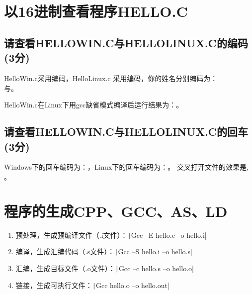 \section{以16进制查看程序HELLO.C}
\subsection{请查看HELLOWIN.C与HELLOLINUX.C的编码(3分)}

HelloWin.c采用编码，HelloLinux.c 采用编码，你的姓名分别编码为：\\
与。

HelloWin.c在Linux下用gcc缺省模式编译后运行结果为：。

\subsection{请查看HELLOWIN.C与HELLOLINUX.C的回车(3分)} 

Windows下的回车编码为：，Linux下的回车编码为：。
交叉打开文件的效果是,
。

\section{程序的生成CPP、GCC、AS、LD}


\begin{enumerate}
	\item 预处理，生成预编译文件（.i文件）：\texttt|Gcc –E hello.c –o hello.i|
	\item 编译，生成汇编代码（.s文件）：\texttt|Gcc –S hello.i –o hello.s|
	\item 汇编，生成目标文件（.o文件）：\texttt|Gcc –c hello.s –o hello.o|
	\item 链接，生成可执行文件：\texttt|Gcc hello.o –o hello.out|
\end{enumerate}

\inputminted{c}{src/hello.c}

